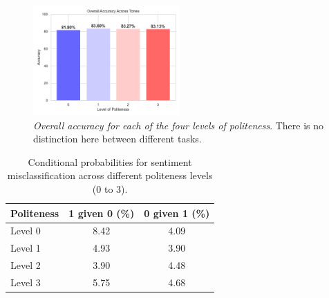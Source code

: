 \documentclass[11pt]{article}
\begin{document}
\begin{figure}[h!]
    \centering
    \includegraphics[width=0.50\textwidth]{accuracy_across_tone_overall.pdf}
    \caption{\textit{Overall accuracy for each of the four levels of politeness}. There is no distinction here between different tasks.}
    \label{fig:accuracies-per-tone-overall}
\end{figure}

\begin{table}[h!]
\centering
\begin{tabular}{lcc}
\toprule
\textbf{Politeness} & \textbf{ 1 given 0 (\%)} & \textbf{ 0 given 1 (\%)} \\ 
\midrule
Level 0                  & 8.42                                    & 4.09                                    \\ 
Level 1                  & 4.93                                    & 3.90                                    \\ 
Level 2                  & 3.90                                    & 4.48                                    \\ 
Level 3                  & 5.75                                    & 4.68                                    \\ 
\bottomrule
\end{tabular}
\caption{Conditional probabilities for sentiment misclassification across different politeness levels (0 to 3).}
\label{tab:sentiment_misclassification}
\end{table}
\end{document}
